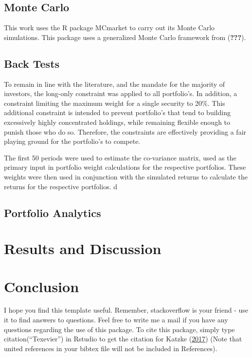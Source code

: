 \documentclass[11pt,preprint, authoryear]{elsarticle}
\numberwithin{equation}{section}
\numberwithin{figure}{section}
\numberwithin{table}{section}
\begin{document}
\hypertarget{monte-carlo}{%
\subsection{Monte Carlo}\label{monte-carlo}}

This work uses the R package MCmarket to carry out its Monte Carlo
simulations. This package uses a generalized Monte Carlo framework from
({\textbf{???}}).

\hypertarget{back-tests}{%
\subsection{Back Tests}\label{back-tests}}

To remain in line with the literature, and the mandate for the majority
of investors, the long-only constraint was applied to all portfolio's.
In addition, a constraint limiting the maximum weight for a single
security to 20\%. This additional constraint is intended to prevent
portfolio's that tend to building excessively highly concentrated
holdings, while remaining flexible enough to punish those who do so.
Therefore, the constraints are effectively providing a fair playing
ground for the portfolio's to compete.

The first 50 periods were used to estimate the co-variance matrix, used
as the primary input in portfolio weight calculations for the respective
portfolios. These weights were then used in conjunction with the
simulated returns to calculate the returns for the respective
portfolios. d

\hypertarget{portfolio-analytics}{%
\subsection{Portfolio Analytics}\label{portfolio-analytics}}

\hypertarget{results-and-discussion}{%
\section{Results and Discussion}\label{results-and-discussion}}

\hypertarget{conclusion}{%
\section{Conclusion}\label{conclusion}}

I hope you find this template useful. Remember, stackoverflow is your
friend - use it to find answers to questions. Feel free to write me a
mail if you have any questions regarding the use of this package. To
cite this package, simply type citation(``Texevier'') in Rstudio to get
the citation for Katzke (\protect\hyperlink{ref-Texevier}{2017}) (Note
that united references in your bibtex file will not be included in
References).
\end{document}
